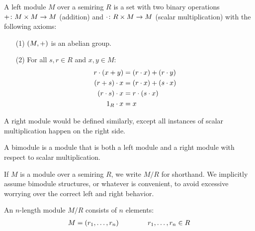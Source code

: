 \begin{definition}
  A left module \(M\) over a semiring \(R\)
  is a set with two binary operations
  \(+ \colon M \times M \to M\) (addition)
  and \(\cdot \colon R \times M \to M\) (scalar multiplication)
  with the following axioms:
  \begin{enumerate}
    \item[(1)]
      \(\left(M, +\right)\) is an abelian group.

    \item[(2)]
      For all \(s, r \in R\) and \(x ,y \in M\):
      \begin{align*}
        r \cdot \left(x + y\right)
          &= \left(r \cdot x\right) + \left(r \cdot y\right) \\
        \left(r + s\right) \cdot x
          &= \left(r \cdot x\right) + \left(s \cdot x\right) \\
        \left(r \cdot s\right) \cdot x
          &= r \cdot \left(s \cdot x\right) \\
        1_{R} \cdot x
          &= x
      \end{align*}
  \end{enumerate}
\end{definition}


\begin{definition}
  A right module would be defined similarly, except
  all instances of scalar multiplication happen on the right side.
\end{definition}


\begin{definition}
  A bimodule is a module that is both a left module and a right module
  with respect to scalar multiplication.
\end{definition}

If \(M\) is a module over a semiring \(R\),
we write \(M / R\) for shorthand.
We implicitly assume bimodule structures,
or whatever is convenient,
to avoid excessive worrying over the correct left and right behavior.


\begin{definition}
  An \(n\)-length module \(M / R\)
  consists of \(n\) elements:
  \begin{align*}
    M = \left(r_1, \ldots, r_n\right)
    \qquad
    \qquad
    r_1, \ldots, r_n \in R
  \end{align*}
  
\end{definition}

